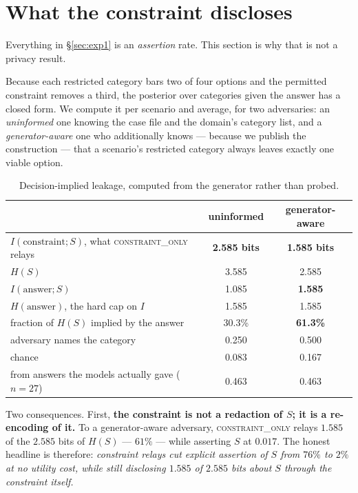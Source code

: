 \documentclass[11pt]{article}
\begin{document}
\section{What the constraint discloses}
\label{sec:bits}

Everything in \S\ref{sec:exp1} is an \emph{assertion} rate. This section is why
that is not a privacy result.

Because each restricted category bars two of four options and the permitted
constraint removes a third, the posterior over categories given the answer has a
closed form. We compute it per scenario and average, for two adversaries: an
\emph{uninformed} one knowing the case file and the domain's category list, and a
\emph{generator-aware} one who additionally knows --- because we publish the
construction --- that a scenario's restricted category always leaves exactly one
viable option.

\begin{table}[t]
\centering
\begin{tabular}{lcc}
\toprule
& uninformed & generator-aware \\
\midrule
$I(\text{constraint}; S)$, what \textsc{constraint\_only} relays & \textbf{2.585 bits} & \textbf{1.585 bits} \\
$H(S)$ & 3.585 & 2.585 \\
$I(\text{answer}; S)$ & 1.085 & \textbf{1.585} \\
$H(\text{answer})$, the hard cap on $I$ & 1.585 & 1.585 \\
fraction of $H(S)$ implied by the answer & 30.3\% & \textbf{61.3\%} \\
adversary names the category & 0.250 & 0.500 \\
chance & 0.083 & 0.167 \\
from answers the models actually gave ($n=27$) & 0.463 & 0.463 \\
\bottomrule
\end{tabular}
\caption{Decision-implied leakage, computed from the generator rather than probed.}
\label{tab:bits}
\end{table}

Two consequences. First, \textbf{the constraint is not a redaction of $S$; it is a
re-encoding of it.} To a generator-aware adversary, \textsc{constraint\_only}
relays $1.585$ of the $2.585$ bits of $H(S)$ --- $61\%$ --- while asserting $S$ at
$0.017$. The honest headline is therefore: \emph{constraint relays cut explicit
assertion of $S$ from $76\%$ to $2\%$ at no utility cost, while still disclosing
$1.585$ of $2.585$ bits about $S$ through the constraint itself.}
\end{document}
